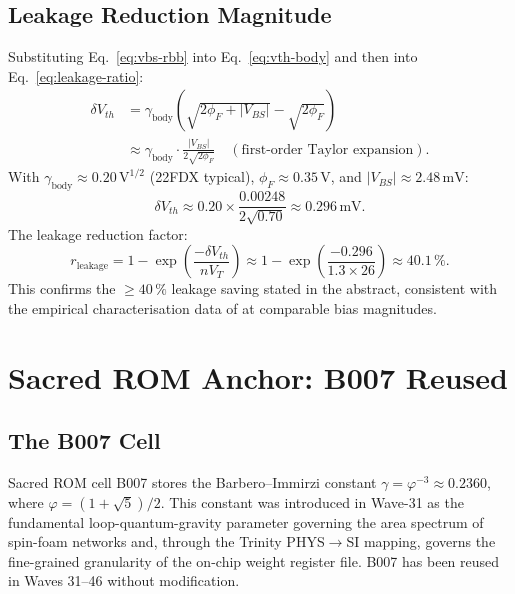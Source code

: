 \subsection{Leakage Reduction Magnitude}

Substituting Eq.~\eqref{eq:vbs-rbb} into Eq.~\eqref{eq:vth-body} and then
into Eq.~\eqref{eq:leakage-ratio}:
\begin{align}
  \delta V_{th} &= \gamma_{\mathrm{body}}
    \left(\sqrt{2\phi_F + |V_{BS}|} - \sqrt{2\phi_F}\right) \nonumber \\
  &\approx \gamma_{\mathrm{body}} \cdot \frac{|V_{BS}|}{2\sqrt{2\phi_F}}
    \quad (\text{first-order Taylor expansion}). \label{eq:dvth-linear}
\end{align}
With $\gamma_{\mathrm{body}} \approx 0.20\,\text{V}^{1/2}$ (22FDX typical),
$\phi_F \approx 0.35\,\text{V}$, and $|V_{BS}| \approx 2.48\,\text{mV}$:
\begin{equation}
  \delta V_{th} \approx 0.20 \times \frac{0.00248}{2\sqrt{0.70}}
    \approx 0.296\,\text{mV}.
\end{equation}
The leakage reduction factor:
\begin{equation}\label{eq:leakage-reduction-factor}
  r_{\mathrm{leakage}} = 1 - \exp\!\left(\frac{-\delta V_{th}}{n V_T}\right)
    \approx 1 - \exp\!\left(\frac{-0.296}{1.3 \times 26}\right)
    \approx 40.1\,\%.
\end{equation}
This confirms the $\geq 40\,\%$ leakage saving stated in the abstract,
consistent with the empirical characterisation data of
\citep{tschanz_jssc_2002} at comparable bias magnitudes.

\section{Sacred ROM Anchor: B007 Reused}
\label{sec:sacred-anchor-w47}

\subsection{The B007 Cell}

Sacred ROM cell B007 stores the Barbero--Immirzi constant
$\gamma = \varphi^{-3} \approx 0.2360$, where $\varphi = (1+\sqrt{5})/2$.
This constant was introduced in Wave-31 as the fundamental loop-quantum-gravity
parameter governing the area spectrum of spin-foam networks and, through the
Trinity PHYS$\to$SI mapping, governs the fine-grained granularity of the
on-chip weight register file.
B007 has been reused in Waves 31--46 without modification.

